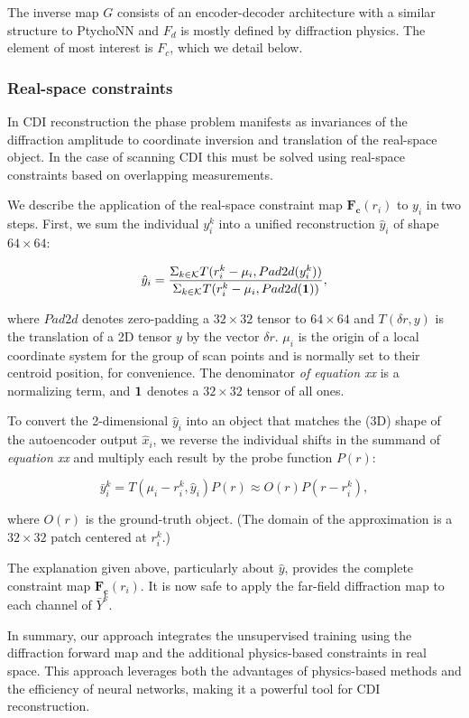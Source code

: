 \documentclass[sn-mathphys]{sn-jnl}%
\theoremstyle{thmstyleone}%
\theoremstyle{thmstyletwo}%
\theoremstyle{thmstylethree}%
\begin{document}
The inverse map $G$ consists of an encoder-decoder architecture with a similar structure to PtychoNN and $F_d$ is mostly defined by diffraction physics. The element of most interest is $F_c$, which we detail below.



\subsubsection{Real-space constraints}
In CDI reconstruction the phase problem manifests as invariances of the diffraction amplitude to coordinate inversion and translation of the real-space object. In the case of scanning CDI this must be solved using real-space constraints based on overlapping measurements.

We describe the application of the real-space constraint map $\mathbf{F_c}(r_i)$ to $y_i$ in two steps. First, we sum the individual $y_i^k$ into a unified reconstruction $\hat{y}_i$ of shape $64 \times 64$:


$$
\hat{y}_i = \frac{\Sigma_{k \in \mathcal{K}} T(r_i^k - \mu_i, Pad2d(y_i^k))} {\Sigma_{k \in \mathcal{K}} T(r_i^k - \mu_i, Pad2d(\bf{1}))},
$$

where $Pad2d$ denotes zero-padding a $32 \times 32$ tensor to $64 \times 64$ and $T(\delta r, y)$ is the translation of a 2D tensor $y$ by the vector $\delta r$. $\mu_i$ is the origin of a local coordinate system for the group of scan points and is normally set to their centroid position, for convenience. The denominator \emph{of equation xx} is a normalizing term, and $\bf{1}$ denotes a $32 \times 32$ tensor of all ones. 

To convert the 2-dimensional $\hat{y}_i$ into an object that matches the (3D) shape of the autoencoder output $\hat{x}_i$, we reverse the individual shifts in the summand of \emph{equation xx} and multiply each result by the probe function $P(r)$:

$$
\bar{y}_i^k = T(\mu_i - r_i^k, \hat{y}_i) P(r) \approx O(r) P(r - r_i^k),
$$

where $O(r)$ is the ground-truth object. (The domain of the approximation is a $32 \times 32$ patch centered at $r_i^k$.)

The explanation given above, particularly about $\hat{y}$, provides the complete constraint map $\mathbf{F_c}(r_i)$. It is now safe to apply the far-field diffraction map to each channel of $\bar{Y}^k$.

In summary, our approach integrates the unsupervised training using the diffraction forward map and the additional physics-based constraints in real space. This approach leverages both the advantages of physics-based methods and the efficiency of neural networks, making it a powerful tool for CDI reconstruction.
\end{document}
